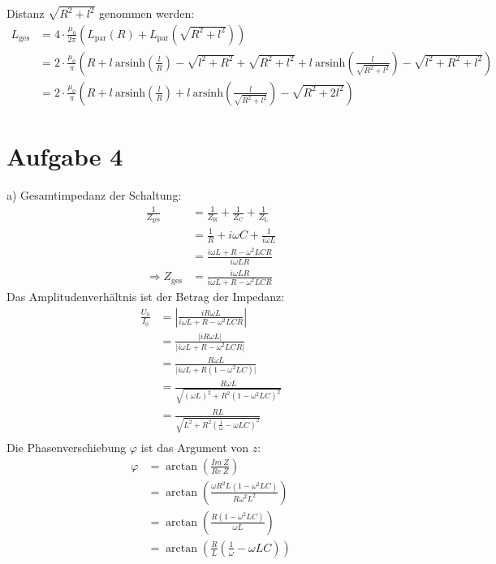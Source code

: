 \documentclass[11pt a4paper]{article}
\newcommand{\arsinh}{\text{arsinh}}
\begin{document}
Distanz $\sqrt{R^2 + l^2}$ genommen werden:
\begin{align*}
	L_\text{ges} 
	&= 4 \cdot \frac{\mu_0}{2\pi}
		\left( L_\text{par} (R) + L_\text{par} \left( \sqrt{R^2 + l^2} \right) \right) \\
	&= 2 \cdot \frac{\mu_0}{\pi} \left( 
			R + l \ \arsinh \left(\frac{l}{R} \right) - \sqrt{l^2 + R^2} + 
			\sqrt{R^2 + l^2} + l \ \arsinh \left(\frac{l}{\sqrt{R^2 + l^2}} \right) 
			- \sqrt{l^2 + R^2 + l^2}
		\right) \\
	&= 2 \cdot \frac{\mu_0}{\pi} \left( 
			R + l \ \arsinh \left(\frac{l}{R} \right)
			  + l \ \arsinh \left(\frac{l}{\sqrt{R^2 + l^2}} \right) 
			- \sqrt{R^2 + 2l^2}
		\right)
\end{align*}



\newpage

\section*{Aufgabe 4}

a) Gesamtimpedanz der Schaltung:
\begin{align*}
	\frac1{Z_\text{ges}}
	&= \frac1{Z_\text{R}} + \frac1{Z_\text{C}} + \frac1{Z_\text{L}} \\
	&= \frac1R + i\omega C + \frac1{i\omega L} \\
	&= \frac{i\omega L + R - \omega^2 LCR}{i\omega LR} \\
	\Rightarrow
	Z_\text{ges} &= \frac{i\omega LR}{i\omega L + R - \omega^2 LCR}
\end{align*}
Das Amplitudenverhältnis ist der Betrag der Impedanz:
\begin{align*}
	\frac{U_0}{I_0}
	&= \left\vert \frac{iR\omega L}{i\omega L + R - \omega^2LCR} \right\vert \\
	&= \frac{\vert iR\omega L \vert}{\vert i\omega L + R - \omega^2LCR \vert} \\
	&= \frac{R\omega L}{\vert i\omega L + R  (1 - \omega^2LC) \vert} \\
	&= \frac{R\omega L}{\sqrt{(\omega L)^2 + R^2  (1 - \omega^2LC)^2}} \\
	&= \frac{RL}{\sqrt{L^2 + R^2  (\frac1\omega - \omega LC)^2}} \\
\end{align*}
Die Phasenverschiebung $\varphi$ ist das Argument von $z$:
\begin{align*}
	\varphi
	&= \arctan \left(\frac{Im \ Z}{Re \ Z} \right) \\
	&= \arctan \left(\frac{\omega R^2L (1 - \omega^2LC)}{R\omega^2L^2} \right) \\
	&= \arctan \left(\frac{R (1 - \omega^2LC)}{\omega L} \right) \\
	&= \arctan \left( \frac RL \left(\frac 1\omega - \omega LC \right) \right) \\
\end{align*}
\end{document}

